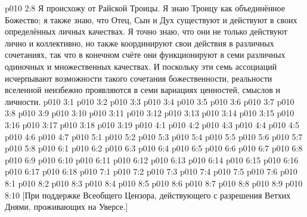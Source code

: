 \vs p010 2:8 Я происхожу от Райской Троицы. Я знаю Троицу как объединённое Божество; я также знаю, что Отец, Сын и Дух существуют и действуют в своих определённых личных качествах. Я точно знаю, что они не только действуют лично и коллективно, но также координируют свои действия в различных сочетаниях, так что в конечном счёте они функционируют в семи различных одиночных и множественных качествах. И поскольку эти семь ассоциаций исчерпывают возможности такого сочетания божественности, реальности вселенной неизбежно проявляются в семи вариациях ценностей, смыслов и личности.
\vs p010 3:1 
\vs p010 3:2 \pc 
\vs p010 3:3 
\vs p010 3:4 
\vs p010 3:5 \pc 
\vs p010 3:6 
\vs p010 3:7 
\vs p010 3:8 
\vs p010 3:9 \pc 
\vs p010 3:10 
\vs p010 3:11 
\vs p010 3:12 
\vs p010 3:13 
\vs p010 3:14 
\vs p010 3:15 
\vs p010 3:16 
\vs p010 3:17 \pc 
\vs p010 3:18 \pc 
\vs p010 3:19 \pc 
{}
\vs p010 4:1 
\vs p010 4:2 \pc 
\vs p010 4:3 
\vs p010 4:4 
\vs p010 4:5 \pc 
\vs p010 4:6 \pc 
\vs p010 4:7 
\vs p010 5:1 
\vs p010 5:2 
\vs p010 5:3 \pc 
\vs p010 5:4 
\vs p010 5:5 
\vs p010 5:6 
\vs p010 5:7 \pc 
\vs p010 5:8 \pc 
{}
\vs p010 6:1 
\vs p010 6:2 \pc 
\vs p010 6:3 \pc 
\vs p010 6:4 \pc 
\vs p010 6:5 \pc 
\vs p010 6:6 
\vs p010 6:7 
\vs p010 6:8 
\vs p010 6:9 
\vs p010 6:10 
\vs p010 6:11 
\vs p010 6:12 
\vs p010 6:13 
\vs p010 6:14 
\vs p010 6:15 
\vs p010 6:16 \pc 
\vs p010 6:17 
\vs p010 6:18 
\vs p010 7:1 
\vs p010 7:2 \pc 
\vs p010 7:3 
\vs p010 7:4 \pc 
\vs p010 7:5 
\vs p010 7:6 
\vs p010 8:1 
\vs p010 8:2 
\vs p010 8:3 \pc 
\vs p010 8:4 
\vs p010 8:5 
\vs p010 8:6 \pc 
\vs p010 8:7 
\vs p010 8:8 
\vs p010 8:9 \pc 
\vsetoff
\vs p010 8:10 [При поддержке Всеобщего Цензора, действующего с разрешения Ветхих Днями, проживающих на Уверсе.]
\quizlink
